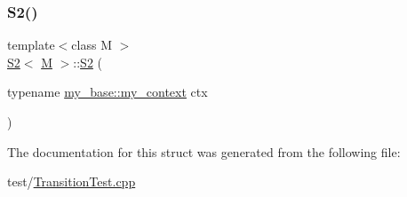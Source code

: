 \subsubsection{\texorpdfstring{S2()}{S2()}}
{\footnotesize\ttfamily template$<$class M $>$ \\
\mbox{\hyperlink{struct_s2}{S2}}$<$ \mbox{\hyperlink{struct_m}{M}} $>$\+::\mbox{\hyperlink{struct_s2}{S2}} (\begin{DoxyParamCaption}\item[{typename \mbox{\hyperlink{struct_orthogonal2_a7ba3bc806df60eb29290185043ac202e}{my\+\_\+base\+::my\+\_\+context}}}]{ctx }\end{DoxyParamCaption})\hspace{0.3cm}{\ttfamily [inline]}}



The documentation for this struct was generated from the following file\+:\begin{DoxyCompactItemize}
\item 
test/\mbox{\hyperlink{_transition_test_8cpp}{Transition\+Test.\+cpp}}\end{DoxyCompactItemize}
